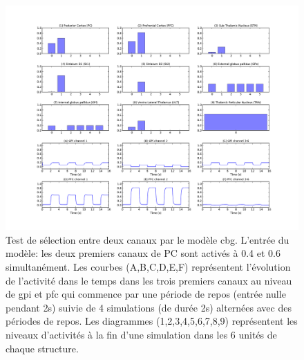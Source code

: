 \begin{figure}
\begin{center}
\includegraphics[width=\textwidth]{figures/ch4_9_girard_04}
\caption{ Test de sélection entre deux canaux par le modèle \protect\gls{cbg}. L'entrée du modèle: les deux premiers canaux de PC sont activés à 0.4 et 0.6 simultanément. Les courbes (A,B,C,D,E,F) représentent l'évolution de l'activité dans le temps dans les trois premiers canaux au niveau de \protect\gls{gpi} et \protect\gls{pfc} qui commence par une période de repos (entrée nulle pendant 2s) suivie de 4 simulations (de durée 2s) alternées avec des périodes de repos. Les diagrammes (1,2,3,4,5,6,7,8,9) représentent les niveaux d'activités à la fin d'une simulation dans les 6 unités de chaque structure.}
\label{CBG4}
\end{center}
\end{figure}
